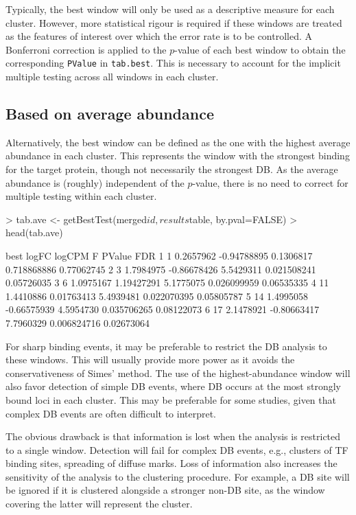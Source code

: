 \documentclass[12pt]{report}
\renewenvironment{Schunk}{\vspace{0pt}}{\vspace{0pt}}
\newcommand{\code}[1]{{\small\texttt{#1}}}
\begin{document}
Typically, the best window will only be used as a descriptive measure for each cluster.
However, more statistical rigour is required if these windows are treated as the features of interest over which the error rate is to be controlled.
A Bonferroni correction is applied to the $p$-value of each best window to obtain the corresponding \code{PValue} in \code{tab.best}.
This is necessary to account for the implicit multiple testing across all windows in each cluster.

\subsection{Based on average abundance}
Alternatively, the best window can be defined as the one with the highest average abundance in each cluster.
This represents the window with the strongest binding for the target protein, though not necessarily the strongest DB.
As the average abundance is (roughly) independent of the $p$-value, there is no need to correct for multiple testing within each cluster.

\begin{Schunk}
\begin{Sinput}
> tab.ave <- getBestTest(merged$id, results$table, by.pval=FALSE)
> head(tab.ave)
\end{Sinput}
\begin{Soutput}
  best     logFC      logCPM         F      PValue        FDR
1    1 0.2657962 -0.94788895 0.1306817 0.718868886 0.77062745
2    3 1.7984975 -0.86678426 5.5429311 0.021508241 0.05726035
3    6 1.0975167  1.19427291 5.1775075 0.026099959 0.06535335
4   11 1.4410886  0.01763413 5.4939481 0.022070395 0.05805787
5   14 1.4995058 -0.66575939 4.5954730 0.035706265 0.08122073
6   17 2.1478921 -0.80663417 7.7960329 0.006824716 0.02673064
\end{Soutput}
\end{Schunk}

For sharp binding events, it may be preferable to restrict the DB analysis to these windows.
This will usually provide more power as it avoids the conservativeness of Simes' method.
The use of the highest-abundance window will also favor detection of simple DB events, where DB occurs at the most strongly bound loci in each cluster.
This may be preferable for some studies, given that complex DB events are often difficult to interpret.

The obvious drawback is that information is lost when the analysis is restricted to a single window.
Detection will fail for complex DB events, e.g., clusters of TF binding sites, spreading of diffuse marks.
Loss of information also increases the sensitivity of the analysis to the clustering procedure.
For example, a DB site will be ignored if it is clustered alongside a stronger non-DB site, as the window covering the latter will represent the cluster.
\end{document}
